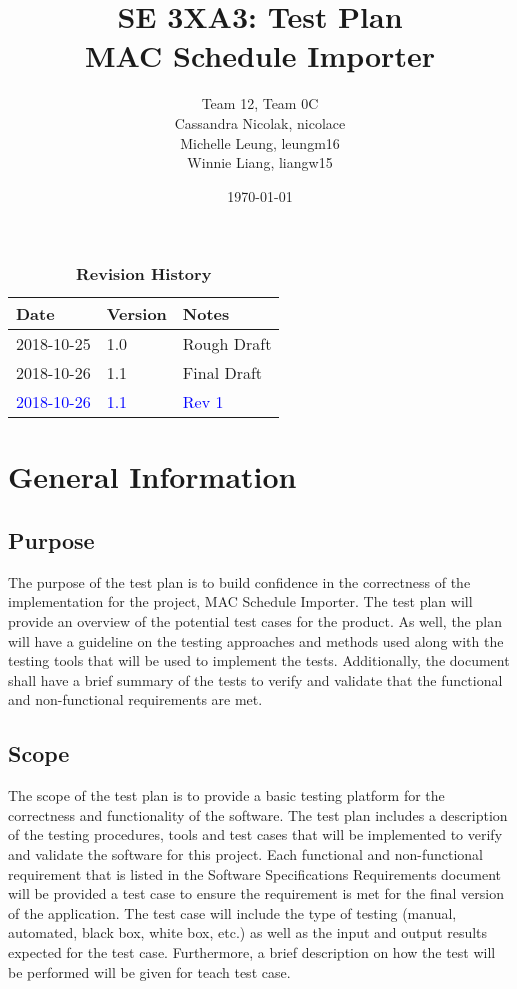 \documentclass[12pt, titlepage]{article}
\title{SE 3XA3: Test Plan\\MAC Schedule Importer}
\author{Team 12, Team 0C
		\\ Cassandra Nicolak, nicolace
		\\ Michelle Leung, leungm16
		\\ Winnie Liang, liangw15
}
\date{\today}
\begin{document}
\maketitle

\tableofcontents
\listoftables
\listoffigures

\begin{table}[bp]
\caption{\bf Revision History}
\begin{tabularx}{\textwidth}{p{3cm}p{2cm}X}
\toprule {\bf Date} & {\bf Version} & {\bf Notes}\\
\midrule
2018-10-25 & 1.0 & Rough Draft\\
2018-10-26 & 1.1 & Final Draft\\
\textcolor{blue}{2018-10-26} & \textcolor{blue}{1.1} & \textcolor{blue}{Rev 1} \\
\bottomrule
\end{tabularx}
\end{table}

\newpage



\section{General Information}

\subsection{Purpose}
\hspace{5mm}
The purpose of the test plan is to build confidence in the correctness of the implementation for the project, MAC Schedule Importer. 
\color{blue}The test plan will provide an overview of the potential test cases for the product. As well, the plan will have a guideline on the testing approaches and methods used along with the testing tools that will be used to implement the tests. Additionally, the document shall have a brief summary of the tests to verify and validate that the functional and non-functional requirements are met.
\color{black}

\subsection{Scope}
\hspace{5mm}
The scope of the test plan is to provide a basic testing platform for the correctness and functionality of the software. The test plan includes a description of the testing procedures, tools and test cases that will be implemented to verify and validate the software for this project.
\color{blue}
Each functional and non-functional requirement that is listed in the Software Specifications Requirements document will be provided a test case to ensure the requirement is met for the final version of the application. The test case will include the type of testing (manual, automated, black box, white box, etc.) as well as the input and output results expected for the test case. Furthermore, a brief description on how the test will be performed will be given for teach test case.
\color{black}
\end{document}
